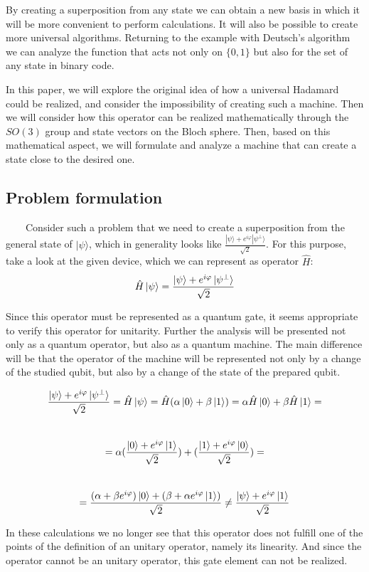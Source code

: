 \documentclass[english,14pt,a4paper]{article}
\begin{document}
	By creating a superposition from any state we can obtain a new basis in which it will be more convenient to perform calculations. It will also be possible to create more universal algorithms. Returning to the example with Deutsch's algorithm we can analyze the function that acts not only on $\{0, 1\}$ but also for the set of any state in binary code. 
	
	In this paper, we will explore the original idea of how a universal Hadamard could be realized, and consider the impossibility of creating such a machine. Then we will consider how this operator can be realized mathematically through the $SO(3)$ group and state vectors on the Bloch sphere. Then, based on this mathematical aspect, we will formulate and analyze a machine that can create a state close to the desired one. 
	
	\subsection{Problem formulation} \ \ \ \
	Consider such a problem that we need to create a superposition from the general state of $|\psi\rangle$, which in generality looks like $ \frac{|\psi\rangle + e^{i\varphi}|\psi^{\perp}\rangle}{\sqrt{2}}$. For this purpose, take a look at the given device, which we can represent as operator $\hat{H}$:
	\[\hat{H}\ket{\psi}  = \frac{\ket{\psi} + e^{i\varphi}\ket{\psi^{\perp}}}{\sqrt{2}}\]
	
	Since this operator must be represented as a quantum gate, it seems appropriate to verify this operator for unitarity. Further the analysis will be presented not only as a quantum operator, but also as a quantum machine. The main difference will be that the operator of the machine will be represented not only by a change of the studied qubit, but also by a change of the state of the prepared qubit. 

	\[ \frac{\ket{\psi} + e^{i\varphi}\ket{\psi^{\perp}}}{\sqrt{2}} = \hat{H}\ket{\psi} = \hat{H}(\alpha \ket{0} + \beta\ket{1}) = \alpha\hat{H}\ket{0}  + \beta\hat{H}\ket{1}=\] \\ \[ = \alpha(\frac{\ket{0} + e^{i\varphi}\ket{1}}{\sqrt{2}}) + (\frac{\ket{1} + e^{i\varphi}\ket{0}}{\sqrt{2}}) =\] \\ \[ = \frac{(\alpha + \beta e^{i\varphi})\ket{0} + (\beta + \alpha e^{i\varphi}\ket{1})}{\sqrt{2}} \neq \frac{\ket{\psi} + e^{i\varphi}\ket{1}}{\sqrt{2}} \]

	In these calculations we no longer see that this operator does not fulfill one of the points of the definition of an unitary operator, namely its linearity. And since the operator cannot be an unitary operator, this gate element can not be realized.
	
\end{document}
